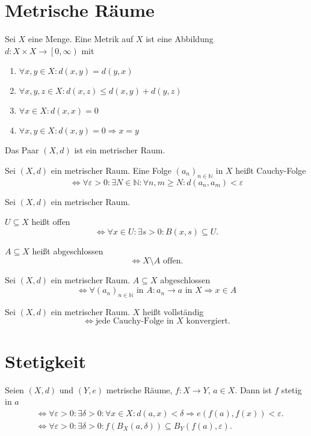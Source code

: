 \documentclass[]{scrartcl}
\newcommand{\N}{\ensuremath{\mathbb{N}}}
\begin{document}
\section*{Metrische R\"aume}
\begin{definition}
Sei $X$ eine Menge. Eine Metrik auf $X$ ist eine Abbildung\\$d:X\times X\to\left[0,\infty\right)$ mit
\begin{enumerate}
\item $\forall x,y\in X:d(x,y)=d(y,x)$
\item $\forall x,y,z\in X:d(x,z)\leq d(x,y)+d(y,z)$
\item $\forall x\in X:d(x,x)=0$
\item $\forall x,y\in X:d(x,y)=0\Rightarrow x=y$
\end{enumerate}
Das Paar $(X,d)$ ist ein metrischer Raum.
\end{definition}

\begin{definition}
Sei $(X,d)$ ein metrischer Raum. Eine Folge $(a_n)_{n\in\N}$ in $X$ hei\ss t Cauchy-Folge
\[\Leftrightarrow\forall\varepsilon>0:\exists N\in\N:\forall n,m\geq N:d(a_n,a_m)<\varepsilon\]
\end{definition}

\begin{definition}
Sei $(X,d)$ ein metrischer Raum.

$U\subseteq X$ hei\ss t offen
\[\Leftrightarrow\forall x\in U:\exists s>0:B(x,s)\subseteq U.\]

$A\subseteq X$ hei\ss t abgeschlossen \[\Leftrightarrow X\setminus A\text{ offen.}\]
\end{definition}

\begin{satz}
Sei $(X,d)$ ein metrischer Raum. $A\subseteq X$ abgeschlossen
\[\Leftrightarrow\forall (a_n)_{n\in\N}\text{ in }A:a_n\to a\text{ in }X\Rightarrow x\in A\]
\end{satz}

\begin{definition}
Sei $(X,d)$ ein metrischer Raum. $X$ hei\ss t vollst\"andig
\[\Leftrightarrow\text{jede Cauchy-Folge in $X$ konvergiert.}\]
\end{definition}

\section*{Stetigkeit}
\begin{definition}[Stetigkeit]
Seien $(X,d)$ und $(Y,e)$ metrische R\"aume, $f:X\to Y$, $a\in X$. Dann ist $f$ stetig in $a$
\begin{align*}
&\Leftrightarrow\forall\varepsilon>0:\exists\delta>0:\forall x\in X:d(a,x)<\delta\Rightarrow e(f(a),f(x))<\varepsilon.\\
&\Leftrightarrow\forall\varepsilon>0:\exists\delta>0:f(B_X(a,\delta))\subseteq B_Y(f(a),\varepsilon).
\end{align*}
\end{definition}
\end{document}
